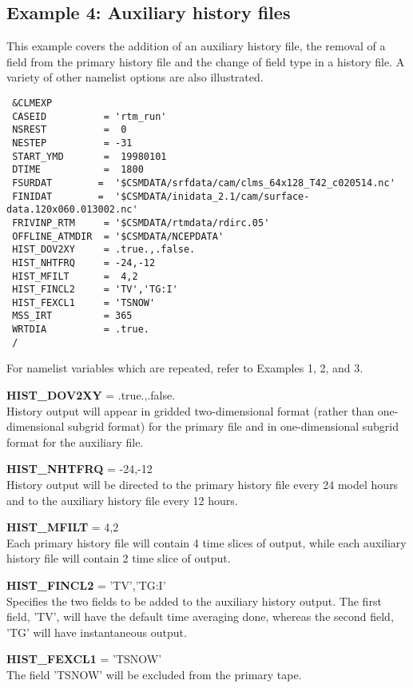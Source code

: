 \subsection {Example 4: Auxiliary history files}

\noindent 
This example covers the addition of an auxiliary history file, the
removal of a field from the primary history file and the change of
field type in a history file. A variety of other namelist options are
also illustrated.

\begin{verbatim}
 &CLMEXP    
 CASEID          = 'rtm_run' 
 NSREST          =  0 
 NESTEP          = -31 
 START_YMD       =  19980101 
 DTIME           =  1800 
 FSURDAT        =  '$CSMDATA/srfdata/cam/clms_64x128_T42_c020514.nc'
 FINIDAT        =  '$CSMDATA/inidata_2.1/cam/surface-data.120x060.013002.nc' 
 FRIVINP_RTM     = '$CSMDATA/rtmdata/rdirc.05' 
 OFFLINE_ATMDIR  = '$CSMDATA/NCEPDATA' 
 HIST_DOV2XY     = .true.,.false. 
 HIST_NHTFRQ     = -24,-12 
 HIST_MFILT      =  4,2 
 HIST_FINCL2     = 'TV','TG:I'
 HIST_FEXCL1     = 'TSNOW'
 MSS_IRT         = 365  
 WRTDIA          = .true. 
 / 
\end{verbatim}

\medskip \noindent 
For namelist variables which are repeated, refer to Examples 1, 2, and 3.

\medskip \noindent 
{\bf HIST\_DOV2XY} = .true.,.false. \\ 
History output will appear in gridded two-dimensional format
(rather than one-dimensional subgrid format) for the primary file and in
one-dimensional subgrid format for the auxiliary file.

\medskip \noindent 
{\bf HIST\_NHTFRQ} = -24,-12 \\ 
History output will be directed to the primary history file every 24
model hours and to the auxiliary history file every 12 hours.

\medskip \noindent 
{\bf HIST\_MFILT} = 4,2 \\ 
Each primary history file will contain 4 time slices of output, while
each auxiliary history file will contain 2 time slice of output.

\medskip \noindent 
{\bf HIST\_FINCL2} = 'TV','TG:I' \\ 
Specifies the two fields to be added to the auxiliary history output. 
The first field, 'TV', will have the default time averaging done,
whereas the second field, 'TG' will have instantaneous output.

\medskip \noindent 
{\bf HIST\_FEXCL1} = 'TSNOW' \\
The field 'TSNOW' will be excluded from the primary tape.

